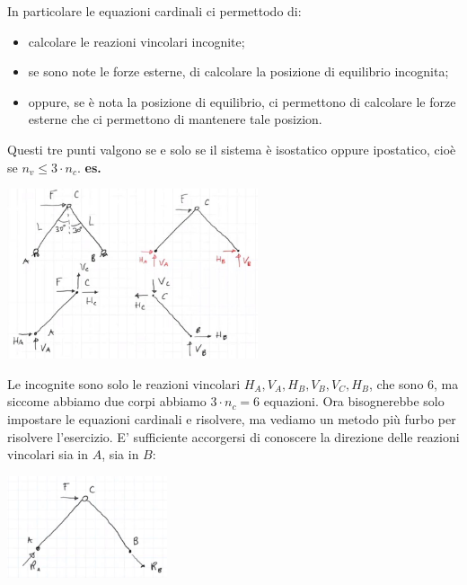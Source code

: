 \newline
In particolare le equazioni cardinali ci permettodo di:
\begin{itemize}
    \item calcolare le reazioni vincolari incognite;
    \item se sono note le forze esterne, di calcolare la posizione di equilibrio incognita;
    \item oppure, se è nota la posizione di equilibrio, ci permettono di calcolare le forze esterne che ci permettono di mantenere tale posizion.
\end{itemize}
Questi tre punti valgono se e solo se il sistema è isostatico oppure ipostatico, cioè se $n_v \leq 3 \cdot n_c$.\newline
\newline
\textbf{es.} 
\begin{center}
    \includegraphics[height=5cm]{../lezione7/img1.JPG}
\end{center}
Le incognite sono solo le reazioni vincolari $H_A, V_A, H_B, V_B, V_C, H_B$, che sono $6$, ma siccome abbiamo due corpi abbiamo $3 \cdot n_c = 6$ equazioni.\newline
\newline
Ora bisognerebbe solo impostare le equazioni cardinali e risolvere, ma vediamo un metodo più furbo per risolvere l'esercizio.\newline
E' sufficiente accorgersi di conoscere la direzione delle reazioni vincolari sia in $A$, sia in $B$:
\begin{center}
    \includegraphics[height=3cm]{../lezione7/img2.JPG}
\end{center}
